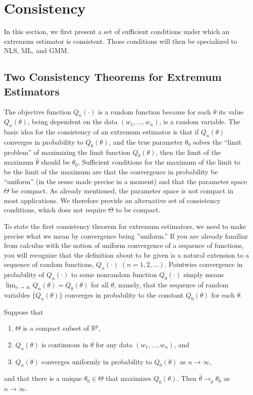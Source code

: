 \section{Consistency}
In this section, we first present a set of sufficient conditions under which an extremum estimator is consistent. Those conditions will then be specialized to NLS, ML, and GMM.

\subsection{Two Consistency Theorems for Extremum Estimators}
The objective function $Q_n(\cdot)$ is a random function because for each $\theta$ its value $Q_n(\theta)$, being dependent on the data $(w_1, \ldots, w_n)$, is a random variable. The basic idea for the consistency of an extremum estimator is that if $Q_n(\theta)$ converges in probability to $Q_0(\theta)$, and the true parameter $\theta_0$ solves the ``limit problem'' of maximizing the limit function $Q_0(\theta)$, then the limit of the maximum $\hat{\theta}$ should be $\theta_0$. Sufficient conditions for the maximum of the limit to be the limit of the maximum are that the convergence in probability be ``uniform'' (in the sense made precise in a moment) and that the parameter space $\Theta$ be compact. As already mentioned, the parameter space is not compact in most applications. We therefore provide an alternative set of consistency conditions, which does not require $\Theta$ to be compact.

To state the first consistency theorem for extremum estimators, we need to make precise what we mean by convergence being ''uniform.'' If you are already familiar from calculus with the notion of uniform convergence of a sequence of functions, you will recognize that the definition about to be given is a natural extension to a sequence of random functions, $Q_n(\cdot)$ $(n = 1, 2, \ldots)$. Pointwise convergence in probability of $Q_n(\cdot)$ to some nonrandom function $Q_0(\cdot)$ simply means $\lim_{n \to \infty} Q_n(\theta) = Q_0(\theta)$ for all $\theta$, namely, that the sequence of random variables $\{Q_n(\theta)\}$ converges in probability to the constant $Q_0(\theta)$ for each $\theta$.

\begin{proposition}
Suppose that
\begin{enumerate}
    \item $\Theta$ is a compact subset of $\mathbb{R}^p$,
    \item $Q_n(\theta)$ is continuous in $\theta$ for any data $(w_1, \ldots, w_n)$, and
    \item $Q_n(\theta)$ converges uniformly in probability to $Q_0(\theta)$ as $n \to \infty$,
\end{enumerate}
and that there is a unique $\theta_0 \in \Theta$ that maximizes $Q_0(\theta)$. Then $\hat{\theta} \to_p \theta_0$ as $n \to \infty$.
\end{proposition}

